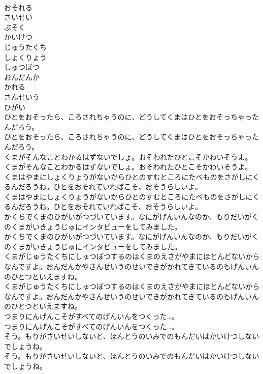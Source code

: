 \documentclass[8pt]{extreport}
\begin{document}
\begin{CJK}{UTF8}{min}
\\	おそれる
\\	さいせい
\\	ぶそく
\\	かいけつ
\\	じゅうたくち
\\	しょくりょう
\\	しゅつぼつ
\\	おんだんか
\\	かれる
\\	さんせいう
\\	ひがい
\\	ひとをおそったら、ころされちゃうのに、どうしてくまはひとをおそっちゃったんだろう。	
\\	ひとをおそったら、ころされちゃうのに、どうしてくまはひとをおそっちゃったんだろう。 
\\	くまがそんなことわかるはずないでしょ。おそわれたひとこそかわいそうよ。	
\\	くまがそんなことわかるはずないでしょ。おそわれたひとこそかわいそうよ。 
\\	くまはやまにしょくりょうがないからひとのすむところにたべものをさがしにくるんだろうね。ひとをおそれていればこそ、おそうらしいよ。	
\\	くまはやまにしょくりょうがないからひとのすむところにたべものをさがしにくるんだろうね。ひとをおそれていればこそ、おそうらしいよ。 
\\	かくちでくまのひがいがつづいています。なにがげんいんなのか、もりだいがくのくまがいきょうじゅにインタビューをしてみました。	
\\	かくちでくまのひがいがつづいています。なにがげんいんなのか、もりだいがくのくまがいきょうじゅにインタビューをしてみました。 
\\	くまがじゅうたくちにしゅつぼつするのはくまのえさがやまにほとんどないからなんですよ。おんだんかやさんせいうのせいできがかれてきているのもげんいんのひとつといえますね。	
\\	くまがじゅうたくちにしゅつぼつするのはくまのえさがやまにほとんどないからなんですよ。おんだんかやさんせいうのせいできがかれてきているのもげんいんのひとつといえますね。 
\\	つまりにんげんこそがすべてのげんいんをつくった…。	
\\	つまりにんげんこそがすべてのげんいんをつくった…。 
\\	そう。もりがさいせいしないと、ほんとうのいみでのもんだいはかいけつしないでしょうね。	
\\	そう。もりがさいせいしないと、ほんとうのいみでのもんだいはかいけつしないでしょうね。 

\end{CJK}
\end{document}
